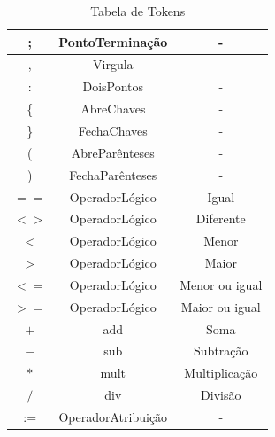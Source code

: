 \documentclass[11pt]{article}
\begin{document}
\begin{table}[H]
\begin{tabular}{c|c|c}
        \hline
         ;                 &        PontoTerminação   &            -                \\
        \hline
         ,                 &        Virgula           &            -                \\
        \hline
         :                 &        DoisPontos        &            -                \\
        \hline
         \{                &        AbreChaves        &            -                \\
        \hline
         \}                &        FechaChaves       &            -                \\
        \hline
         (                 &        AbreParênteses    &            -                \\
        \hline
         )                 &        FechaParênteses   &            -                \\
        \hline
        \hline
         $==$              &      OperadorLógico  &            Igual                     \\
        \hline
         $<>$              &      OperadorLógico  &            Diferente                 \\
        \hline
         $<$               &      OperadorLógico  &            Menor                     \\
        \hline
         $>$               &      OperadorLógico  &            Maior                     \\
        \hline
         $<=$              &      OperadorLógico  &            Menor ou igual            \\
        \hline
         $>=$              &      OperadorLógico  &            Maior  ou igual           \\
        \hline
        \hline
         $+$               &      add             &            Soma                      \\
        \hline
         $-$               &      sub             &            Subtração                 \\
        \hline
         $*$               &      mult            &            Multiplicação             \\
        \hline
         $/$               &      div             &            Divisão                   \\
        \hline
        \hline
         $:=$              &      OperadorAtribuição  &            -                         \\
        \hline
       

        
    \end{tabular}
    \caption{Tabela de Tokens}
\end{table}
\end{document}
